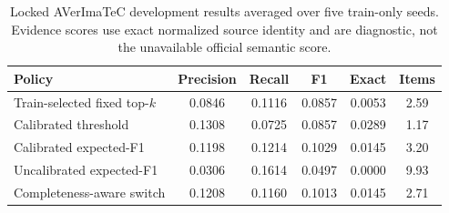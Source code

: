 \begin{table}[t]
\centering
\caption{Locked AVerImaTeC development results averaged over five train-only seeds. Evidence scores use exact normalized source identity and are diagnostic, not the unavailable official semantic score.}
\label{tab:external_selector}
\small
\begin{tabular}{lccccc}
\toprule
Policy & Precision & Recall & F1 & Exact & Items \\
\midrule
Train-selected fixed top-$k$ & 0.0846 & 0.1116 & 0.0857 & 0.0053 & 2.59 \\
Calibrated threshold & 0.1308 & 0.0725 & 0.0857 & 0.0289 & 1.17 \\
Calibrated expected-F1 & 0.1198 & 0.1214 & 0.1029 & 0.0145 & 3.20 \\
Uncalibrated expected-F1 & 0.0306 & 0.1614 & 0.0497 & 0.0000 & 9.93 \\
Completeness-aware switch & 0.1208 & 0.1160 & 0.1013 & 0.0145 & 2.71 \\
\bottomrule
\end{tabular}
\end{table}
